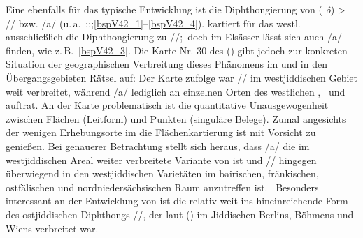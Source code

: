    Eine ebenfalls für das \hai{{\WJ}} typische Entwicklung ist die Diphthongierung von  ({\mhd}  \textit{ô}) > /\textopeno {}/ bzw. /a/ (u.\,a.\, \citealt[167]{Timm1987};\citealt[79]{Herzog1992};\citealt[28]{Beider2010};\ref{bspV42_1}–\ref{bspV42_4}). \cite[58f]{GuggenheimGruenberg1973} kartiert für das westl. \hai{{\SWJ}} ausschließlich die Diphthongierung zu /\textopeno {}/;\, doch im Elsässer \hai{{\SWJ}} lässt sich auch /a/ finden, wie z.\,B.\, \ref{bspV42_3}. Die Karte Nr. 30 des  (\citeyear[79]{Herzog1992}) gibt jedoch zur konkreten  Situation der geographischen Verbreitung dieses Phänomens im \hai{{\WJ}} und in den Übergangsgebieten Rätsel auf: Der Karte zufolge war /\textopeno {}/ im westjiddischen Gebiet weit verbreitet, während /a/ lediglich an einzelnen Orten des westlichen \hai{{\WJ}}, \,%
    und  auftrat. An der Karte problematisch ist die quantitative Unausgewogenheit zwischen Flächen (Leitform) und Punkten (singuläre Belege). Zumal angesichts der wenigen Erhebungsorte im \hai{{\WJ}} die Flächenkartierung ist mit Vorsicht zu genießen. Bei genauerer Betrachtung stellt sich heraus, dass /a/  die im westjiddischen Areal weiter verbreitete Variante von  ist und /\textopeno {}/ hingegen überwiegend in den westjiddischen Varietäten im bairischen, fränkischen, ostfälischen und nordniedersächsischen Raum anzutreffen ist. \,%
   Besonders interessant an der Entwicklung von  ist die relativ weit ins \hai{{\WJ}} hineinreichende Form des ostjiddischen Diphthongs /\textopeno \textsubarch{\textsci}/, der laut  (\citeyear[79]{Herzog1992}) im Jiddischen Berlins, Böhmens und Wiens verbreitet war.    
   
